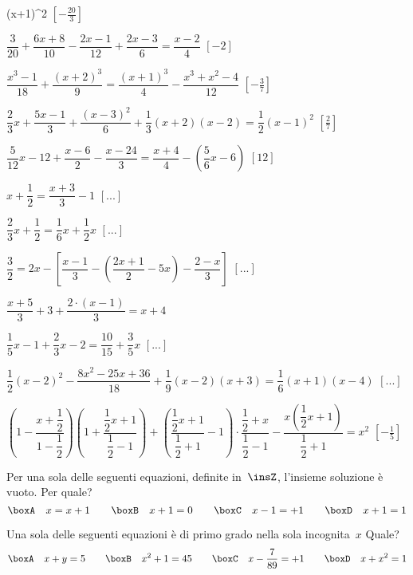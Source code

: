 \begin{esercizio}[\Ast]
\begin{enumeratea}
        \left(x+1\right)^{2}\)
  \hfill \(\left[-{\frac{20}{3}}\right]\)
 \item \(\dfrac{3}{20}+\dfrac{6x+8}{10}-\dfrac{2x-1}{12}+\dfrac{2x-3}{6}=
        \dfrac{x-2}{4}\)
  \hfill \(\left[-2\right]\)
 \item \(\dfrac{x^{3}-1}{18}+\dfrac{(x+2)^{3}}{9}=
        \dfrac{(x+1)^{3}}{4}-\dfrac{x^{3}+x^{2}-4}{12}\)
  \hfill \(\left[-{\frac{3}{7}}\right]\)
 \item \(\dfrac{2}{3}x+\dfrac{5x-1}{3}+\dfrac{(x-3)^{2}}{6}+
        \dfrac{1}{3}(x+2)(x-2)=\dfrac{1}{2}(x-1)^{2}\)
  \hfill \(\left[\frac{2}{7}\right]\)
 \item \(\dfrac{5}{12}x-12+\dfrac{x-6}{2}-\dfrac{x-24}{3}=
        \dfrac{x+4}{4}-\left(\dfrac{5}{6}x-6\right)\)
  \hfill \(\left[12\right]\)
 \item \(x+\dfrac{1}{2}=\dfrac{x+3}{3}-1\)
  \hfill \(\left[...\right]\)
 \item \(\dfrac{2}{3}x+\dfrac{1}{2}=\dfrac{1}{6}x+\dfrac{1}{2}x\)
  \hfill \(\left[...\right]\)
 \item \(\dfrac{3}{2}=2x-\left[\dfrac{x-1}{3}-
        \left(\dfrac{2x+1}{2}-5x\right)-\dfrac{2-x}{3}\right]\)
  \hfill \(\left[...\right]\)
 \item \(\dfrac{x+5}{3}+3+\dfrac{2\cdot \left(x-1\right)}{3}=x+4\)
 \item \(\dfrac{1}{5}x-1+\dfrac{2}{3}x-2=\dfrac{10}{15}+\dfrac{3}{5}x\)
  \hfill \(\left[...\right]\)
 \item \(\dfrac{1}{2}(x-2)^{2}-\dfrac{8x^{2}-25x+36}{18}+\dfrac{1}{9}(x-2)(x+3)=
        \dfrac{1}{6}(x+1)(x-4)\)
  \hfill \(\left[...\right]\)
 \item \(\left(1-\dfrac{x+\dfrac{1}{2}}{1-\dfrac{1}{2}}\right)
        \left(1+\dfrac{\dfrac{1}{2}x+1}{\dfrac{1}{2}-1}\right)+
        \left(\dfrac{\dfrac{1}{2}x+1}{\dfrac{1}{2}+1}-1\right)\cdot 
        {\dfrac{\dfrac{1}{2}+x}{\dfrac{1}{2}-1}}-
        \dfrac{x\left(\dfrac{1}{2}x+1\right)}{\dfrac{1}{2}+1}=x^{2}\)
  \hfill \(\left[-{\frac{1}{5}}\right]\)
\end{enumeratea}
\end{esercizio}

\begin{esercizio}
\label{ese:13.44}
Per una sola delle seguenti equazioni, definite in~\(\insZ\), l'insieme soluzione 
è vuoto. Per quale?
\[\boxA\quad x=x+1\qquad\boxB\quad x+1=0\qquad\boxC\quad x-1=+1\qquad\boxD\quad 
x+1=1\]
\end{esercizio}

\begin{esercizio}
\label{ese:13.45}
Una sola delle seguenti equazioni è di primo grado nella sola incognita~\(x\) 
Quale?
\[\boxA\quad x+y=5\qquad\boxB\quad x^{2}+1=45\qquad\boxC\quad 
x-\dfrac{7}{89}=+1\qquad\boxD\quad x+x^{2}=1\]
\end{esercizio}


